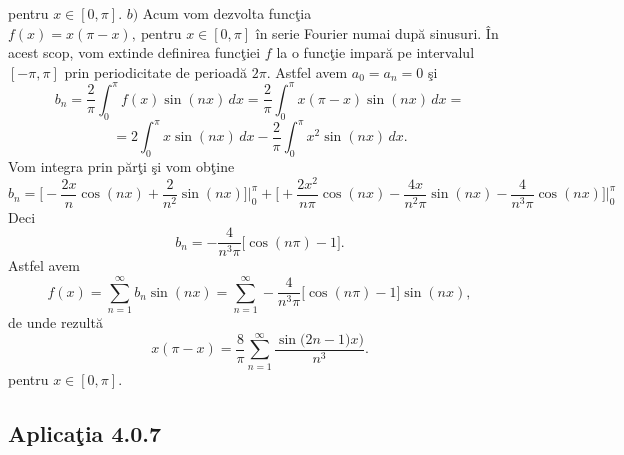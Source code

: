 \documentclass[a4paper,openany,12pt]{report}
\begin{document}
pentru $x\in[0,\pi]$.
\newline
\newline
$b)$ Acum vom dezvolta func\c tia $f(x)=x(\pi-x), \: \text{pentru } x \in [0,\pi]$ \^ in serie Fourier numai dup\u a sinusuri. \^ In acest scop, vom extinde definirea func\c tiei $f$ la o func\c tie impar\u a pe intervalul $[-\pi, \pi]$ prin periodicitate de perioad\u a $2\pi$. Astfel avem $a_0=a_n=0$ \c si
\begin{equation*}
b_n=\frac{2}{\pi}\int_0^{\pi}f(x)\sin(nx)\, dx=\frac{2}{\pi}\int_0^{\pi}x(\pi-x) \sin(nx)\, dx =
\end{equation*} 
\begin{equation*}
=2\int_0^{\pi}x\sin(nx)\, dx - \frac{2}{\pi}\int_0^{\pi}x^2\sin(nx)\, dx.
\end{equation*}
Vom integra prin p\u ar\c ti \c si vom ob\c tine
\begin{equation*}
b_n=\Big[-\frac{2x}{n}\cos(nx)+\frac{2}{n^2}\sin(nx)\Big]\bigg|_{0}^{\pi}+\Big[+\frac{2x^2}{n\pi}\cos(nx)-\frac{4x}{n^2\pi}\sin(nx)-\frac{4}{n^3\pi}\cos(nx)\Big]\bigg|_{0}^{\pi}
\end{equation*}
Deci 
\begin{equation*}
b_n=-\frac{4}{n^3\pi}\Big[\cos(n\pi)-1\Big].
\end{equation*}
Astfel avem
\begin{equation*}
f(x)=\sum_{n=1}^\infty b_n \sin(nx)=\sum_{n=1}^{\infty}-\frac{4}{n^3\pi}\Big[\cos(n\pi)-1\Big]\sin(nx),
\end{equation*}
de unde rezult\u a
\begin{equation*}
x(\pi-x)=\frac{8}{\pi}\sum_{n=1}^{\infty}\frac{\sin\big(2n-1)x\big)}{n^3}.
\end{equation*}
pentru $x\in[0,\pi]$.


\subsection*{Aplica\c tia 4.0.7}
\end{document}
